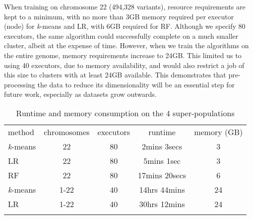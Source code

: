 \documentclass{llncs}
\newcommand{\kMeans}{\textit{k}-means }
\begin{document}
{When training on chromosome 22 (494,328 variants), resource requirements are kept to a minimum, with no more than 3GB memory required per executor (node)
for \kMeans and LR, with 6GB required for RF. Although we specify 80 executors, the same algorithm could successfully complete on a much smaller cluster, albeit at the expense of time. 
However, when we train the algorithms on the entire genome, memory requirements increase to 24GB. This limited us to using 40 executors, due to memory availability, and would also restrict
a job of this size to clusters with at least 24GB available. This demonstrates that pre-processing the data to reduce its dimensionality will
be an essential step for future work, especially as datasets grow outwards.


\begin{table}
\caption{Runtime and memory consumption on the 4 super-populations}
\begin{center}
\renewcommand{\arraystretch}{1.4}
\setlength\tabcolsep{3pt}
\begin{tabular}{lcccc}
\hline\noalign{\smallskip}
method  & chromosomes & executors & runtime & memory (GB) \\
\kMeans & 22 & 80 & 2mins 3secs & 3 \\
LR  & 22 & 80 & 5mins 1sec & 3 \\
RF & 22 & 80 & 17mins 20secs & 6 \\
\kMeans & 1-22 & 40 & 14hrs 44mins & 24 \\
LR  & 1-22 & 40 & 30hrs 12mins & 24 \\
\noalign{\smallskip}
\hline
\label{resources}
\end{tabular}
\end{center}
\end{table}




}
\end{document}
